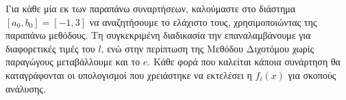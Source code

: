 Για κάθε μία εκ των παραπάνω συναρτήσεων, καλούμαστε στο διάστημα $[a_0, b_0] = [-1 , 3]$ να αναζητήσουμε
το ελάχιστο τους, χρησιμοποιώντας της παραπάνω μεθόδους. Τη συγκεκριμένη διαδικασία την επαναλαμβάνουμε για διαφορετικές τιμές του $l$, ενώ στην περίπτωση της
Μεθόδου Διχοτόμου χωρίς παραγώγους μεταβάλλουμε και το $e$. Κάθε φορά που καλείται κάποια συνάρτηση θα καταγράφονται οι υπολογισμοί που χρειάστηκε να εκτελέσει η $f_i(x)$ για σκοπούς ανάλυσης.